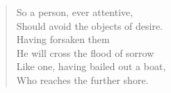 \begin{verse}
 So a person, ever attentive,\\
Should avoid the objects of desire.\\
Having forsaken them\\
He will cross the flood of sorrow\\
Like one, having bailed out a boat,\\
Who reaches the further shore.


\end{verse}
